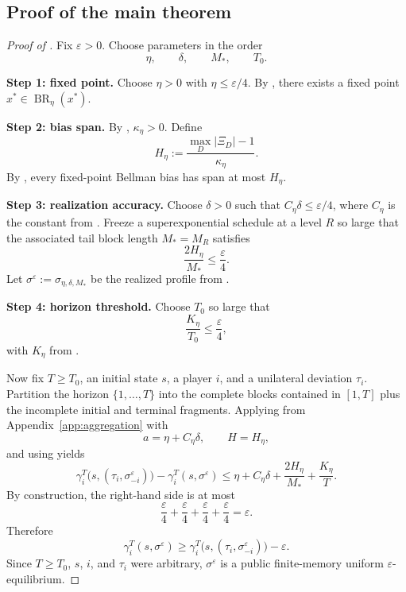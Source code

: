 \documentclass[12pt]{article}
\theoremstyle{definition}
\newcommand{\eps}{\varepsilon}
\newcommand{\1}{\mathbf{1}}
\DeclareMathOperator{\BR}{BR}
\begin{document}
\subsection{Proof of the main theorem}

\begin{proof}[Proof of ]
Fix $\eps>0$.  Choose parameters in the order
\[
\eta,\qquad \delta,\qquad M_*,\qquad T_0.
\]

\smallskip
\noindent\textbf{Step 1: fixed point.}
Choose $\eta>0$ with $\eta\le \eps/4$.  By
, there exists a fixed point $x^*\in\BR_\eta(x^*)$.

\smallskip
\noindent\textbf{Step 2: bias span.}
By , $\kappa_\eta>0$.  Define
\[
H_\eta:=\frac{\max_D|\Xi_D|-1}{\kappa_\eta}.
\]
By , every fixed-point Bellman bias has span at most $H_\eta$.

\smallskip
\noindent\textbf{Step 3: realization accuracy.}
Choose $\delta>0$ such that $C_\eta\delta\le \eps/4$, where $C_\eta$ is the
constant from .  Freeze a superexponential schedule at a
level $R$ so large that the associated tail block length $M_*=M_R$ satisfies
\[
\frac{2H_\eta}{M_*}\le \frac{\eps}{4}.
\]
Let $\sigma^\eps:=\sigma_{\eta,\delta,M_*}$ be the realized profile from
.

\smallskip
\noindent\textbf{Step 4: horizon threshold.}
Choose $T_0$ so large that
\[
\frac{K_\eta}{T_0}\le \frac{\eps}{4},
\]
with $K_\eta$ from .

Now fix $T\ge T_0$, an initial state $s$, a player $i$, and a unilateral deviation
$\tau_i$.  Partition the horizon $\{1,\dots,T\}$ into the complete blocks
contained in $[1,T]$ plus the incomplete initial and terminal fragments.  Applying
 from Appendix~\ref{app:aggregation} with
\[
a=\eta+C_\eta\delta,
\qquad H=H_\eta,
\]
and using  yields
\[
\gamma_i^T\bigl(s,(\tau_i,\sigma^\eps_{-i})\bigr)
-
\gamma_i^T(s,\sigma^\eps)
\le
\eta + C_\eta\delta + \frac{2H_\eta}{M_*} + \frac{K_\eta}{T}.
\]
By construction, the right-hand side is at most
\[
\frac{\eps}{4}+\frac{\eps}{4}+\frac{\eps}{4}+\frac{\eps}{4}=\eps.
\]
Therefore
\[
\gamma_i^T(s,\sigma^\eps)
\ge
\gamma_i^T\bigl(s,(\tau_i,\sigma^\eps_{-i})\bigr)-\eps.
\]
Since $T\ge T_0$, $s$, $i$, and $\tau_i$ were arbitrary, $\sigma^\eps$ is a
public finite-memory uniform $\eps$-equilibrium.
\end{proof}
\end{document}
